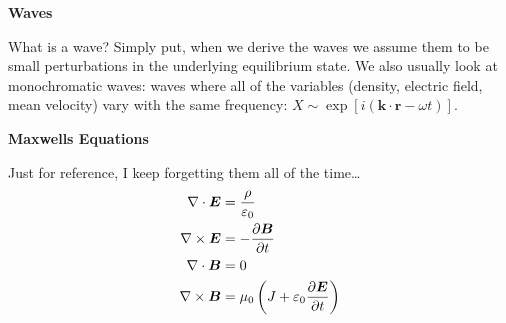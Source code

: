 \documentclass[10pt,landscape]{article}
\renewcommand{\vec}{\bm}
\newcommand{\topiccolor}{green}
\renewcommand{\section}[2]{%
	\renewcommand{\topiccolor}{#2}
	\begin{tcolorbox}[boxsep=0.5mm, left=1mm, right=1mm, top=0mm, bottom=0mm,
		colback=#2!30, colframe=#2, arc is angular]%
		\centering \textbf{#1}%
	\end{tcolorbox}%
	\nopagebreak%
}
\begin{document}
\begin{multicols*}{3}
\section{Waves}{red}

What is a wave?
Simply put, when we derive the waves we assume them to be small
perturbations in the underlying equilibrium state.
We also usually look at monochromatic waves:
waves where all of the variables
(density, electric field, mean velocity)
vary with the same frequency:
$X \sim \exp[i (\vec k \cdot \vec r - \omega t)]$.

\section{Maxwells Equations}{gray}

Just for reference, I keep forgetting them all of the time\ldots
\begin{align*}
	\nabla \cdot \vec E &= \frac{\rho}{\varepsilon_0}\\
	\nabla \times \vec E &= -\diffp{\vec B}{t}\\
	\nabla \cdot \vec B &= 0\\
	\nabla \times \vec B &= \mu_0\left(J + \varepsilon_0 \diffp{\vec E}{t}\right)
\end{align*}

\end{multicols*}
\end{document}
